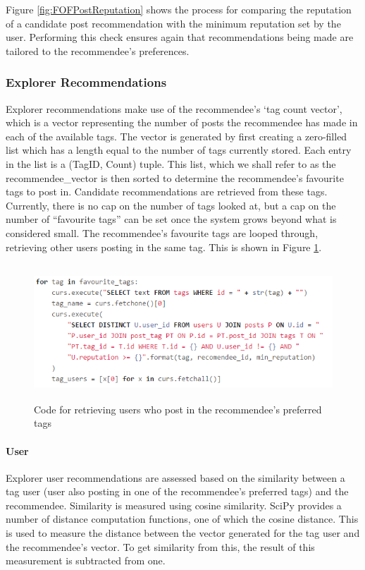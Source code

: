 \noindent Figure \ref{fig:FOFPostReputation} shows the process for comparing the reputation of a candidate post recommendation with the minimum reputation set by the user. Performing this check ensures again that recommendations being made are tailored to the recommendee's preferences.

\subsubsection{Explorer Recommendations}
Explorer recommendations make use of the recommendee's `tag count vector', which is a vector representing the number of posts the recommendee has made in each of the available tags. The vector is generated by first creating a zero-filled list which has a length equal to the number of tags currently stored. Each entry in the list is a (TagID, Count) tuple. This list, which we shall refer to as the recommendee\_vector is then sorted to determine the recommendee's favourite tags to post in. Candidate recommendations are retrieved from these tags. Currently, there is no cap on the number of tags looked at, but a cap on the number of ``favourite tags'' can be set once the system grows beyond what is considered small. The recommendee's favourite tags are looped through, retrieving other users posting in the same tag. This is shown in Figure \ref{fig:ExplorerFavouriteTags}.

\begin{figure}[H]
\centering
\includegraphics[height=2in]{Images/Implementation/ExplorerFavouriteTags}
\caption{Code for retrieving users who post in the recommendee's preferred tags}
\label{fig:ExplorerFavouriteTags}
\end{figure}

\paragraph{User} Explorer user recommendations are assessed based on the similarity between a tag user (user also posting in one of the recommendee's preferred tags) and the recommendee. Similarity is measured using cosine similarity. SciPy provides a number of distance computation functions, one of which the cosine distance. This is used to measure the distance between the vector generated for the tag user and the recommendee's vector. To get similarity from this, the result of this measurement is subtracted from one.

